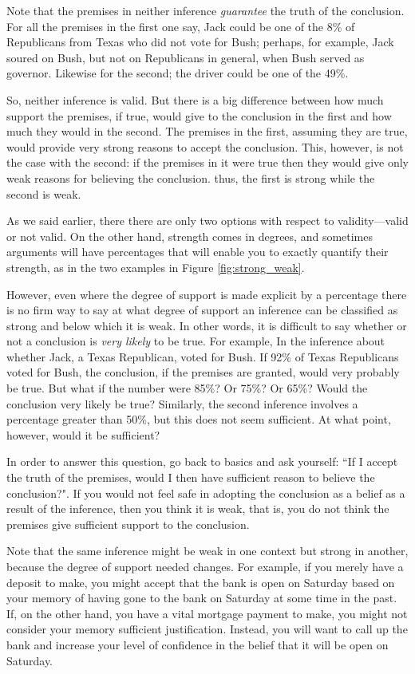 Note that the premises in neither inference \textit{guarantee} the truth of the conclusion. For all the premises in the first one say, Jack could be one of the 8\% of Republicans from Texas who did not vote for Bush; perhaps, for example, Jack soured on Bush, but not on Republicans in general, when Bush served as governor. Likewise for the second; the driver could be one of the 49\%.

So, neither inference is valid. But there is a big difference between how much support the premises, if true, would give to the conclusion in the first and how much they would in the second. The premises in the first, assuming they are true, would provide very strong reasons to accept the conclusion. This, however, is not the case with the second: if the premises in it were true then they would give only weak reasons for believing the conclusion. thus, the first is strong while the second is weak.

As we said earlier, there there are only two options with respect to validity---valid or not valid. On the other hand, strength comes in degrees, and sometimes arguments will have percentages that will enable you to exactly quantify their strength, as in the two examples in Figure \ref{fig:strong_weak}.

However, even where the degree of support is made explicit by a percentage there is no firm way to say at what degree of support an inference can be classified as strong and below which it is weak. In other words, it is difficult to say whether or not a conclusion is \textit{very likely} to be true. For example, In the inference about whether Jack, a Texas Republican, voted for Bush. If 92\% of Texas Republicans voted for Bush, the conclusion, if the premises are granted, would very probably be true. But what if the number were 85\%? Or 75\%? Or 65\%? Would the conclusion very likely be true? Similarly, the second inference involves a percentage greater than 50\%, but this does not seem sufficient. At what point, however, would it be sufficient?

In order to answer this question, go back to basics and ask yourself: ``If I accept the truth of the premises, would I then have sufficient reason to believe the conclusion?". If you would not feel safe in adopting the conclusion as a belief as a result of the inference, then you think it is weak, that is, you do not think the premises give sufficient support to the conclusion.

Note that the same inference might be weak in one context but strong in another, because the degree of support needed changes. For example, if you merely have a deposit to make, you might accept that the bank is open on Saturday based on your memory of having gone to the bank on Saturday at some time in the past. If, on the other hand, you have a vital mortgage payment to make, you might not consider your memory sufficient justification. Instead, you will want to call up the bank and increase your level of confidence in the belief that it will be open on Saturday.

